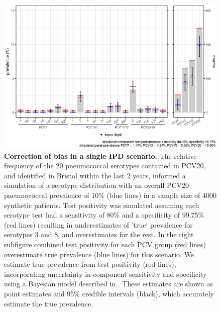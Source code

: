 \documentclass[10pt,letterpaper]{article}
\begin{document}
\begin{figure}[hb!]
\centerline{\includegraphics[width = \textwidth]{fig/fig5-simulation-result-bayes-v2.eps}}
\caption{{\bf Correction of bias in a single IPD scenario.}
The relative frequency of the 20 pneumococcal serotypes contained in PCV20, and identified in Bristol within the last 2 years, informed a simulation of a serotype distribution with an overall PCV20 pneumococcal prevalence of 10\% (blue lines) in a sample size of 4000 synthetic patients. Test positivity was simulated assuming each serotype test had a sensitivity of 80\% and a specificity of 99.75\% (red lines) resulting in underestimates of 'true` prevalence for serotypes 3 and 8, and overestimates for the rest. In the right subfigure combined test positivity for each PCV group (red lines) overestimate true prevalence (blue lines) for this scenario. We estimate true prevalence from test positivity (red lines), incorporating uncertainty in component sensitivity and specificity using a Bayesian model described in . These estimates are shown as point estimates and 95\% credible intervals (black), which accurately estimate the true prevalence.}
\label{fig5}
\end{figure}
\end{document}
